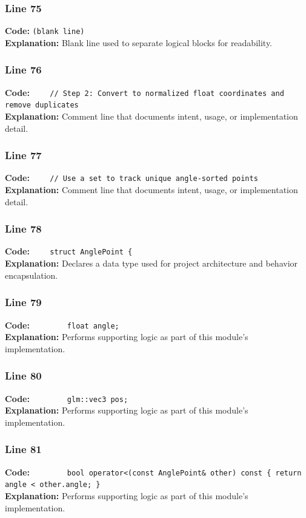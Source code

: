 \documentclass[11pt,a4paper]{article}
\begin{document}
\subsubsection*{Line 75}
\textbf{Code:} \texttt{(blank line)}\\
\textbf{Explanation:} Blank line used to separate logical blocks for readability.

\subsubsection*{Line 76}
\textbf{Code:} \verb|    // Step 2: Convert to normalized float coordinates and remove duplicates|\\
\textbf{Explanation:} Comment line that documents intent, usage, or implementation detail.

\subsubsection*{Line 77}
\textbf{Code:} \verb|    // Use a set to track unique angle-sorted points|\\
\textbf{Explanation:} Comment line that documents intent, usage, or implementation detail.

\subsubsection*{Line 78}
\textbf{Code:} \verb|    struct AnglePoint {|\\
\textbf{Explanation:} Declares a data type used for project architecture and behavior encapsulation.

\subsubsection*{Line 79}
\textbf{Code:} \verb|        float angle;|\\
\textbf{Explanation:} Performs supporting logic as part of this module's implementation.

\subsubsection*{Line 80}
\textbf{Code:} \verb|        glm::vec3 pos;|\\
\textbf{Explanation:} Performs supporting logic as part of this module's implementation.

\subsubsection*{Line 81}
\textbf{Code:} \verb|        bool operator<(const AnglePoint& other) const { return angle < other.angle; }|\\
\textbf{Explanation:} Performs supporting logic as part of this module's implementation.
\end{document}
